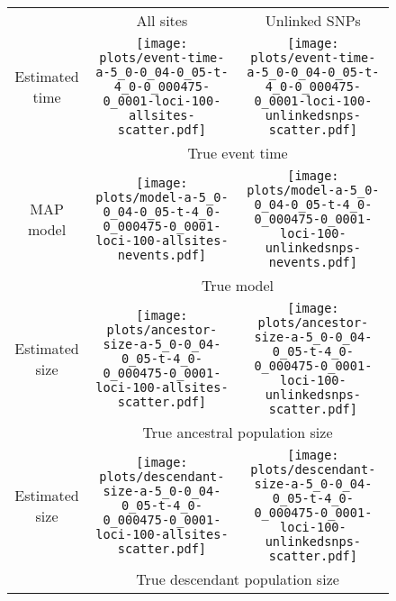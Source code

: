 \documentclass[border=10pt,varwidth=30cm]{standalone}
\begin{document}
\begin{figure}
    \centering
    \begin{tabular}{@{}ccc@{}}
        & \multirow{1}{0.15\textwidth}{\LARGE\centering All sites}
        & \multirow{1}{0.15\textwidth}{\LARGE\centering Unlinked SNPs} \\[2.5ex]
        \multirow{1}{*}[8em]{\begin{sideways}\large Estimated time\end{sideways}}
        & \texttt{[image: plots/event-time-a-5\_0-0\_04-0\_05-t-4\_0-0\_000475-0\_0001-loci-100-allsites-scatter.pdf]}
        & \texttt{[image: plots/event-time-a-5\_0-0\_04-0\_05-t-4\_0-0\_000475-0\_0001-loci-100-unlinkedsnps-scatter.pdf]} \\
        & \multicolumn{2}{c}{\large True event time} \\
        \multirow{1}{*}[7.5em]{\begin{sideways}\large MAP model\end{sideways}}
        & \texttt{[image: plots/model-a-5\_0-0\_04-0\_05-t-4\_0-0\_000475-0\_0001-loci-100-allsites-nevents.pdf]}
        & \texttt{[image: plots/model-a-5\_0-0\_04-0\_05-t-4\_0-0\_000475-0\_0001-loci-100-unlinkedsnps-nevents.pdf]} \\
        & \multicolumn{2}{c}{\large True model} \\
        \multirow{1}{*}[8em]{\begin{sideways}\large Estimated size\end{sideways}}
        & \texttt{[image: plots/ancestor-size-a-5\_0-0\_04-0\_05-t-4\_0-0\_000475-0\_0001-loci-100-allsites-scatter.pdf]}
        & \texttt{[image: plots/ancestor-size-a-5\_0-0\_04-0\_05-t-4\_0-0\_000475-0\_0001-loci-100-unlinkedsnps-scatter.pdf]} \\
        & \multicolumn{2}{c}{\large True ancestral population size} \\
        \multirow{1}{*}[8em]{\begin{sideways}\large Estimated size\end{sideways}}
        & \texttt{[image: plots/descendant-size-a-5\_0-0\_04-0\_05-t-4\_0-0\_000475-0\_0001-loci-100-allsites-scatter.pdf]}
        & \texttt{[image: plots/descendant-size-a-5\_0-0\_04-0\_05-t-4\_0-0\_000475-0\_0001-loci-100-unlinkedsnps-scatter.pdf]} \\
        & \multicolumn{2}{c}{\large True descendant population size} \\
    \end{tabular}
\end{figure}
\end{document}
